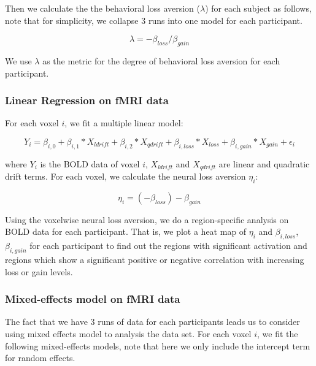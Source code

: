 Then we calculate the the behavioral loss aversion ($ \lambda $) for each subject as follows, note that for simplicity, we collapse 3 runs into one model for each participant.

\begin{equation}
\lambda = -\beta_{loss} / \beta_{gain}
\end{equation}

We use $\lambda$ as the metric for the degree of behavioral loss aversion for each participant. 

\subsubsection{Linear Regression on fMRI data}

For each voxel $i$, we fit a multiple linear model:

\begin{equation}
Y_{i} = \beta_{i, 0} + \beta_{i,1} *X_{ldrift} + \beta_{i, 2} * X_{qdrift} + \beta_{i, loss} *X_{loss} + \beta_{i, gain} * X_{gain}  + 
\epsilon_i
\end{equation}

where $Y_{i}$ is the BOLD data of voxel $i$,  $X_{ldrift}$ and $X_{qdrift}$ are linear and quadratic drift terms. For each voxel, we calculate the 
neural loss aversion $\eta_i$:

\begin{equation}
\eta_i = (-\beta_{loss}) - \beta_{gain}
\end{equation}

Using the voxelwise neural loss aversion, we do a region-specific analysis on 
BOLD data for each participant. That is, we plot a heat map of $\eta_i$ and  
$\beta_{i, loss}$, $ \beta_{i, gain}$ for each participant to find out the 
regions with significant activation and regions which show a significant 
positive or negative correlation with increasing loss or gain levels.

\subsubsection{Mixed-effects model on fMRI data}


The fact that we have 3 runs of data for each participants leads us to consider using mixed effects model to analysis the data set. For each voxel $i$, we fit the following mixed-effects models, note that here we only include the intercept term for random effects. 

